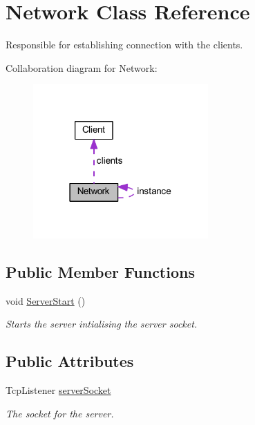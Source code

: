 \hypertarget{class_network}{}\section{Network Class Reference}
\label{class_network}


Responsible for establishing connection with the clients.  




Collaboration diagram for Network\+:\nopagebreak
\begin{figure}[H]
\begin{center}
\leavevmode
\includegraphics[width=190pt]{class_network__coll__graph}
\end{center}
\end{figure}
\subsection*{Public Member Functions}
\begin{DoxyCompactItemize}
\item 
void \mbox{\hyperlink{class_network_a22cabc15681adaf99a76dc9ff3106d1a}{Server\+Start}} ()
\begin{DoxyCompactList}\small\item\em Starts the server intialising the server socket. \end{DoxyCompactList}\end{DoxyCompactItemize}
\subsection*{Public Attributes}
\begin{DoxyCompactItemize}
\item 
Tcp\+Listener \mbox{\hyperlink{class_network_ad3a8c496428c641ab10b4c0925762155}{server\+Socket}}
\begin{DoxyCompactList}\small\item\em The socket for the server. \end{DoxyCompactList}\end{DoxyCompactItemize}
